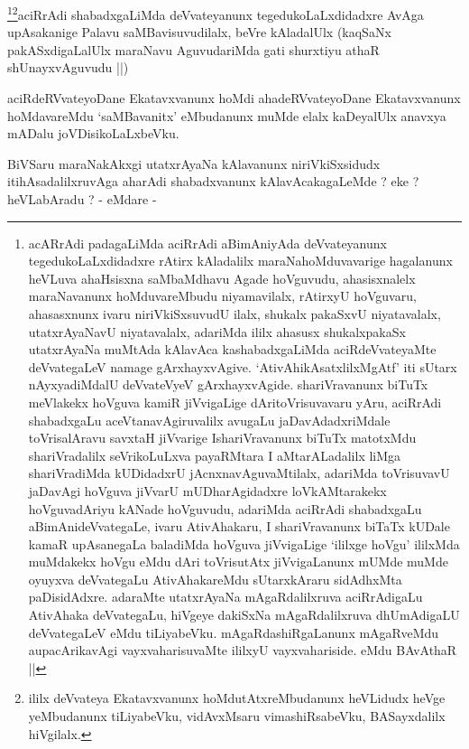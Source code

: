 \begin{artha}
\footnote{acARrAdi padagaLiMda aciRrAdi aBimAniyAda deVvateyanunx
  tegedukoLaLxdidadxre rAtirx kAladalilx maraNahoMduvavarige
  hagalanunx heVLuva ahaHsisxna saMbaMdhavu Agade hoVguvudu,
  ahasisxnalelx maraNavanunx hoMduvareMbudu niyamavilalx, rAtirxyU
  hoVguvaru, ahasasxnunx ivaru niriVkiSxsuvudU ilalx, shukalx pakaSxvU
  niyatavalalx, utatxrAyaNavU niyatavalalx, adariMda ililx ahasusx
  shukalxpakaSx utatxrAyaNa muMtAda kAlavAca kashabadxgaLiMda
  aciRdeVvateyaMte deVvategaLeV namage
  gArxhayxvAgive. `AtivAhikAsatxlilxMgAtf' iti sUtarx nAyxyadiMdalU
  deVvateVyeV gArxhayxvAgide. shariVravanunx biTuTx meVlakekx hoVguva
  kamiR jiVvigaLige dAritoVrisuvavaru yAru, aciRrAdi shabadxgaLu
  aceVtanavAgiruvalilx avugaLu jaDavAdadxriMdale toVrisalAravu savxtaH
  jiVvarige IshariVravanunx biTuTx matotxMdu shariVradalilx
  seVrikoLuLxva payaRMtara I aMtarALadalilx liMga shariVradiMda
  kUDidadxrU jAcnxnavAguvaMtilalx, adariMda toVrisuvavU jaDavAgi
  hoVguva jiVvarU mUDharAgidadxre loVkAMtarakekx hoVguvadAriyu kANade
  hoVguvudu, adariMda aciRrAdi shabadxgaLu aBimAnideVvategaLe, ivaru
  AtivAhakaru, I shariVravanunx biTaTx kUDale kamaR upAsanegaLa
  baladiMda hoVguva jiVvigaLige `ililxge hoVgu' ililxMda muMdakekx
  hoVgu eMdu dAri toVrisutAtx jiVvigaLanunx mUMde muMde oyuyxva
  deVvategaLu AtivAhakareMdu sUtarxkAraru sidAdhxMta
  paDisidAdxre. adaraMte utatxrAyaNa mAgaRdalilxruva aciRrAdigaLu
  AtivAhaka deVvategaLu, hiVgeye dakiSxNa mAgaRdalilxruva dhUmAdigaLU
  deVvategaLeV eMdu tiLiyabeVku. mAgaRdashiRgaLanunx mAgaRveMdu
  aupacArikavAgi vayxvaharisuvaMte ililxyU vayxvahariside. eMdu
  BAvAthaR ||}\footnote{ililx deVvateya Ekatavxvanunx
  hoMdutAtxreMbudanunx heVLidudx heVge yeMbudanunx tiLiyabeVku,
  vidAvxMsaru vimashiRsabeVku, BASayxdalilx hiVgilalx.}aciRrAdi shabadxgaLiMda deVvateyanunx tegedukoLaLxdidadxre
AvAga upAsakanige Palavu saMBavisuvudilalx, beVre kAladalUlx (kaqSaNx
pakASxdigaLalUlx maraNavu AguvudariMda gati shurxtiyu athaR
shUnayxvAguvudu ||)
\end{artha}

\begin{artha}
aciRdeRVvateyoDane Ekatavxvanunx hoMdi ahadeRVvateyoDane Ekatavxvanunx
hoMdavareMdu `saMBavanitx' eMbudanunx muMde elalx kaDeyalUlx anavxya
mADalu joVDisikoLaLxbeVku.
\end{artha}

\begin{artha}
BiVSaru maraNakAkxgi utatxrAyaNa kAlavanunx niriVkiSxsidudx
itihAsadalilxruvAga aharAdi shabadxvanunx kAlavAcakagaLeMde ? eke ?
heVLabAradu ? - eMdare -
\end{artha}

